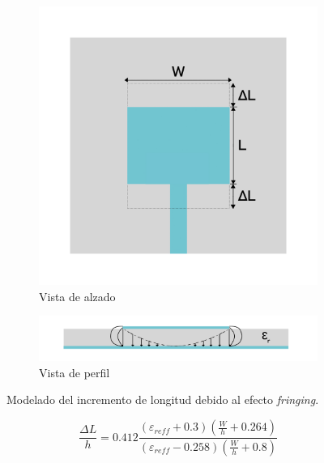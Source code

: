 \begin{figure}[h]
     \centering
     \begin{subfigure}[b]{0.7\textwidth}
         \centering
         \includegraphics[width=\textwidth]{archivos/parche/efectivelength2}
         \caption{Vista de alzado}
         \label{fig:planta}
     \end{subfigure}
     \hfill
     \begin{subfigure}[b]{0.7\textwidth}
         \centering
         \includegraphics[width=\textwidth]{archivos/parche/efectivelength}
         \caption{Vista de perfil}
         \label{fig:perfil}
     \end{subfigure}
     \hfill
        \caption{Modelado del incremento de longitud debido al efecto \textit{fringing}.}
        \label{fig:modelado2}
\end{figure}

\begin{equation}
	\frac{\Delta L}{h}=0.412\frac{(\varepsilon _{reff}+0.3)(\frac{W}{h}+0.264)}{(\varepsilon _{reff}-0.258)(\frac{W}{h}+0.8)}
	\label{eq:deltal}
\end{equation}


